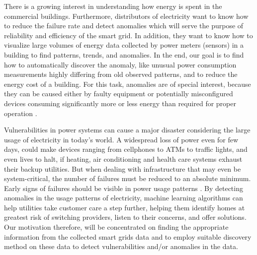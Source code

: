 There is a growing interest in understanding how energy is spent in the commercial buildings. Furthermore, distributors of electricity want to know how to reduce the failure rate and detect anomalies which will serve the purpose of reliability and efficiency of the smart grid. In addition, they want to know how to visualize large volumes of energy data collected by power meters (sensors) in a building to find patterns, trends, and anomalies. In the end, our goal is to find how to automatically discover the anomaly, like unusual power consumption measurements highly differing from old observed patterns, and to reduce the energy cost of a building. For this task, anomalies are of special interest, because they can be caused either by faulty equipment or potentially misconfigured devices consuming significantly more or less energy than required for proper operation \cite{janetzko2014anomaly}.

\frenchspacing Vulnerabilities in power systems can cause a major disaster considering the large usage of electricity in today's world. A widespread loss of power even for few days, could make devices ranging from cellphones to ATMs to traffic lights, and even lives to halt, if heating, air conditioning and health care systems exhaust their backup utilities. But when dealing with infrastructure that may even be system-critical, the number of failures must be reduced to an absolute minimum. Early signs of failures should be visible in power usage patterns \cite{janetzko2014anomaly}. By detecting anomalies in the usage patterns of electricity, machine learning algorithms can help utilities take customer care a step further, helping them identify homes at greatest risk of switching providers, listen to their concerns, and offer solutions. Our motivation therefore, will be concentrated on finding the appropriate information from the collected smart grids data and to employ suitable discovery method on these data to detect vulnerabilities and/or anomalies in the data. 

\frenchspacing

\label{sec:Introduction}